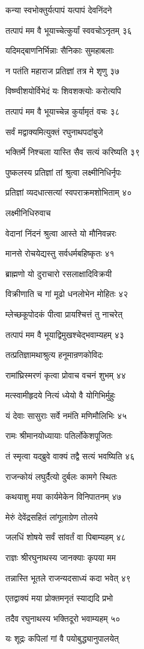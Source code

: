 कन्या स्वभोक्तुर्यत्पापं यत्पापं देवनिंदने

तत्पापं मम वै भूयाच्चेत्कुर्यां स्ववचोऽनृतम् ३६

यदिमद्बाणनिर्भिन्नाः सैनिकाः सुमहाबलाः

न पतंति महाराज प्रतिज्ञां तत्र मे शृणु ३७

विष्ण्वीशयोर्विभेदं यः शिवशक्त्योः करोत्यपि

तत्पापं मम वै भूयाच्चेन्न कुर्यामृतं वचः ३८

सर्वं मद्वाक्यमित्युक्तं रघुनाथपदांबुजे

भक्तिर्मे निश्चला यास्ति सैव सत्यं करिष्यति ३९

पुष्कलस्य प्रतिज्ञां तां श्रुत्वा लक्ष्मीनिधिर्नृपः

प्रतिज्ञां व्यदधात्सत्यां स्वपराक्रमशोभिताम् ४०

लक्ष्मीनिधिरुवाच

वेदानां निंदनं श्रुत्वा आस्ते यो मौनिवन्नरः

मानसे रोचयेद्यस्तु सर्वधर्मबहिष्कृतः ४१

ब्राह्मणो यो दुराचारो रसलाक्षादिविक्रयी

विक्रीणाति च गां मूढो धनलोभेन मोहितः ४२

म्लेच्छकूपोदकं पीत्वा प्रायश्चित्तं तु नाचरेत्

तत्पापं मम वै भूयाद्विमुखश्चेद्भवाम्यहम् ४३

तत्प्रतिज्ञामथाश्रुत्य हनूमान्रणकोविदः

रामांघ्रिस्मरणं कृत्वा प्रोवाच वचनं शुभम् ४४

मत्स्वामीहृदये नित्यं ध्येयो वै योगिभिर्मुहुः

यं देवाः सासुराः सर्वे नमंति मणिमौलिभिः ४५

रामः श्रीमानयोध्यायाः पतिर्लोकेशपूजितः

तं स्मृत्वा यद्ब्रुवे वाक्यं तद्वै सत्यं भवष्यिति ४६

राजन्कोयं लघुर्दैत्यो दुर्बलः कामगे स्थितः

कथयाशु मया कार्यमेकेन विनिपातनम् ४७

मेरुं देवेंद्रसहितं लांगूलाग्रेण तोलये

जलधिं शोषये सर्वं सांवर्तं वा पिबाम्यहम् ४८

राज्ञः श्रीरघुनाथस्य जानक्याः कृपया मम

तन्नास्ति भूतले राजन्यदसाध्यं कदा भवेत् ४९

एतद्वाक्यं मया प्रोक्तमनृतं स्याद्यदि प्रभो

तदैव रघुनाथस्य भक्तिदूरो भवाम्यहम् ५०

यः शूद्रः कपिलां गां वै पयोबुद्ध्यानुपालयेत्

